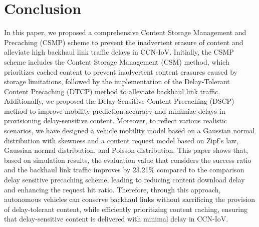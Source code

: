 \documentclass[journal]{IEEEtran}
\begin{document}
\section{Conclusion} \label{sec.conc}
In this paper, we proposed a comprehensive Content Storage Management and Precaching (CSMP) scheme to prevent the inadvertent erasure of content and alleviate high backhaul link traffic delays in CCN-IoV.
Initially, the CSMP scheme includes the Content Storage Management (CSM) method, which prioritizes cached content to prevent inadvertent content erasures caused by storage limitations, followed by the implementation of the Delay-Tolerant Content Precaching (DTCP) method to alleviate backhaul link traffic.
Additionally, we proposed the Delay-Sensitive Content Precaching (DSCP) method to improve mobility prediction accuracy and minimize delays in provisioning delay-sensitive content.
Moreover, to reflect various realistic scenarios, we have designed a vehicle mobility model based on a Gaussian normal distribution with skewness and a content request model based on Zipf's law, Gaussian normal distribution, and Poisson distribution.
This paper shows that, based on simulation results, the evaluation value that considers the success ratio and the backhaul link traffic improves by 23.21\% compared to the comparison delay sensitive precaching scheme, leading to reducing content download delay and enhancing the request hit ratio.
Therefore, through this approach, autonomous vehicles can conserve backhaul links without sacrificing the provision of delay-tolerant content, while efficiently prioritizing content caching, ensuring that delay-sensitive content is delivered with minimal delay in CCN-IoV.






\end{document}
